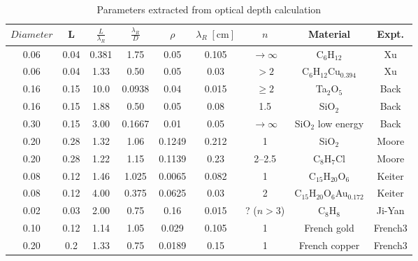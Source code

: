 \documentclass{article}
\begin{document}
\begin{table}[h!]
\centering
\begin{tabular}{c c c c c c c c c}
$Diameter$ & L & $\frac{L}{\lambda_R}$ & $\frac{\lambda_R}{D}$ & $\rho$ & $\lambda_R\;[\mathrm{cm}]$ & $n$ & Material & Expt. \\
\hline
0.06 & 0.04 & 0.381 & 1.75 & 0.05   & 0.105 & $\to\infty$ & C$_6$H$_{12}$ & Xu \\
0.06 & 0.04 & 1.33 & 0.50 & 0.05   & 0.03 & $>2$        & C$_6$H$_{12}$Cu$_{0.394}$ & Xu \\
0.16 & 0.15 & 10.0 & 0.0938 & 0.04   & 0.015 & $\ge 2$     & Ta$_2$O$_5$ & Back \\
0.16 & 0.15 & 1.88 & 0.50 & 0.05   & 0.08 & 1.5     & SiO$_2$ & Back \\
0.30 & 0.15 & 3.00 & 0.1667 & 0.01   & 0.05 & $\to\infty$     & SiO$_2$ low energy & Back \\
0.20 & 0.28 & 1.32 & 1.06 & 0.1249 & {\color{red}0.212} & 1           & SiO$_2$ & Moore \\
0.20 & 0.28 & 1.22 & 1.15 & 0.1139 & 0.23 & 2--2.5      & C$_8$H$_7$Cl & Moore \\
0.08 & 0.12 & 1.46 & 1.025 & 0.0065  & 0.082  & 1           & C$_{15}$H$_{20}$O$_6$ & Keiter \\
0.08 & 0.12 & 4.00 & 0.375 & 0.0625 & 0.03 & 2           & C$_{15}$H$_{20}$O$_6$Au$_{0.172}$ & Keiter \\
0.02 & 0.03 & 2.00 & 0.75 & 0.16   & 0.015 & ? ($n>3$)   & C$_8$H$_8$ & Ji-Yan \\
0.10 & 0.12 & 1.14 & 1.05 & 0.029  & 0.105  & 1           & French gold & French3 \\
0.20 & 0.2 & 1.33 & 0.75 & 0.0189  & 0.15  & 1           & French copper & French3 \\
\hline
\end{tabular}
\caption{Parameters extracted from optical depth calculation}
\label{tab:optical depth}
\end{table}
\end{document}
